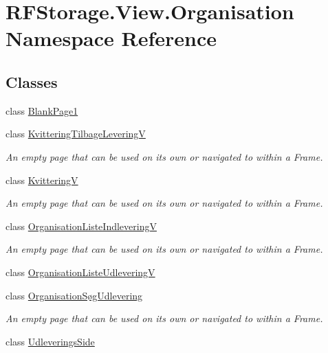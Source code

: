 \hypertarget{namespace_r_f_storage_1_1_view_1_1_organisation}{}\section{R\+F\+Storage.\+View.\+Organisation Namespace Reference}
\label{namespace_r_f_storage_1_1_view_1_1_organisation}
\subsection*{Classes}
\begin{DoxyCompactItemize}
\item 
class \mbox{\hyperlink{class_r_f_storage_1_1_view_1_1_organisation_1_1_blank_page1}{Blank\+Page1}}
\item 
class \mbox{\hyperlink{class_r_f_storage_1_1_view_1_1_organisation_1_1_kvittering_tilbage_levering_v}{Kvittering\+Tilbage\+LeveringV}}
\begin{DoxyCompactList}\small\item\em An empty page that can be used on its own or navigated to within a Frame. \end{DoxyCompactList}\item 
class \mbox{\hyperlink{class_r_f_storage_1_1_view_1_1_organisation_1_1_kvittering_v}{KvitteringV}}
\begin{DoxyCompactList}\small\item\em An empty page that can be used on its own or navigated to within a Frame. \end{DoxyCompactList}\item 
class \mbox{\hyperlink{class_r_f_storage_1_1_view_1_1_organisation_1_1_organisation_liste_indlevering_v}{Organisation\+Liste\+IndleveringV}}
\begin{DoxyCompactList}\small\item\em An empty page that can be used on its own or navigated to within a Frame. \end{DoxyCompactList}\item 
class \mbox{\hyperlink{class_r_f_storage_1_1_view_1_1_organisation_1_1_organisation_liste_udlevering_v}{Organisation\+Liste\+UdleveringV}}
\item 
class \mbox{\hyperlink{class_r_f_storage_1_1_view_1_1_organisation_1_1_organisation_s_xC3_xB8g_udlevering}{Organisation\+Søg\+Udlevering}}
\begin{DoxyCompactList}\small\item\em An empty page that can be used on its own or navigated to within a Frame. \end{DoxyCompactList}\item 
class \mbox{\hyperlink{class_r_f_storage_1_1_view_1_1_organisation_1_1_udleverings_side}{Udleverings\+Side}}
\end{DoxyCompactItemize}
